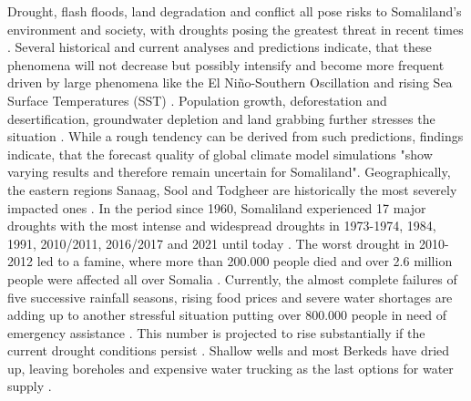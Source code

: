 Drought, flash floods, land degradation and conflict all pose risks to Somaliland's environment and society, with droughts posing the greatest threat in recent times \autocite{abdulkadirAssessmentDroughtRecurrence2017}. Several historical and current analyses and predictions indicate, that these phenomena will not decrease but possibly intensify and become more frequent driven by large phenomena like the El Niño-Southern Oscillation and rising Sea Surface Temperatures (SST) \autocite{abdulkadirAssessmentDroughtRecurrence2017,aliMitigatingNaturalDisasters2017a, balintMonitoringDroughtCombined2013, erianGARSpecialReport2021, FAOSWALIMSomalia, museiSPEIbasedSpatialTemporal2021, nationaldroughtcommitteeSOMALILANDDROUGHTRAPID2022,trisosAfrica2022}. Population growth, deforestation and desertification, groundwater depletion and land grabbing further stresses the situation \autocite{aliMitigatingNaturalDisasters2017a}. While a rough tendency can be derived from such predictions, \autocite[10]{abdulkadirAssessmentDroughtRecurrence2017} findings indicate, that the forecast quality of global climate model simulations "show varying results and therefore remain uncertain for Somaliland".\newline
Geographically, the eastern regions Sanaag, Sool and Todgheer are historically the most severely impacted ones \autocite{abdulkadirAssessmentDroughtRecurrence2017, FAOSWALIMSomalia}. In the period since 1960, Somaliland experienced 17 major droughts with the most intense and widespread droughts in 1973-1974, 1984, 1991, 2010/2011, 2016/2017 and 2021 until today \autocite{abdulkadirAssessmentDroughtRecurrence2017, credEMDATInternationalDisasters2023}. The worst drought in 2010-2012 led to a famine, where more than 200.000 people died and over 2.6 million people were affected all over Somalia \autocite{srcsDRMStrategicPlan2021}.\newline
Currently, the almost complete failures of five successive rainfall seasons, rising food prices and severe water shortages are adding up to another stressful situation putting over 800.000 people in need of emergency assistance \autocite{nationaldroughtcommitteeSOMALILANDDROUGHTRAPID2022}. This number is projected to rise substantially if the current drought conditions persist \autocite{swansonNearlyMillionPeople2022}. Shallow wells and most Berkeds have dried up, leaving boreholes and expensive water trucking as the last options for water supply \autocite{nationaldroughtcommitteeSOMALILANDDROUGHTRAPID2022}.\newline
